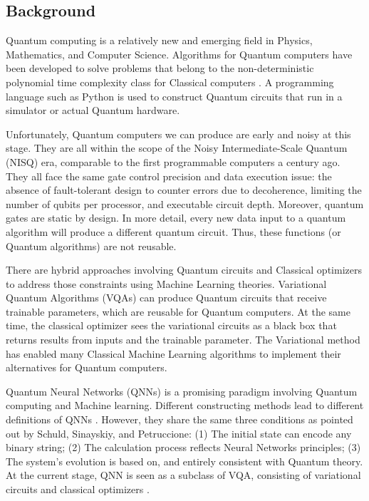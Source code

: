 \subsection{Background}\label{Background Section}
Quantum computing is a relatively new and emerging field in Physics, Mathematics, and Computer Science. 
Algorithms for Quantum computers have been developed to solve problems that belong to the non-deterministic polynomial time complexity class for Classical computers \cite{williamsSolvingNPCompleteProblems2011,jiangQuantumAnnealingPrime2018,farhiQuantumApproximateOptimization2014}. 
A programming language such as Python is used to construct Quantum circuits that run in a simulator or actual Quantum hardware. 

Unfortunately, Quantum computers we can produce are early and noisy at this stage. 
They are all within the scope of the Noisy Intermediate-Scale Quantum (NISQ) \cite{brooksQuantumSupremacyHunt2019} era, comparable to the first programmable computers a century ago. 
They all face the same gate control precision and data execution issue: the absence of fault-tolerant design to counter errors due to decoherence, limiting the number of qubits per processor, and executable circuit depth. 
Moreover, quantum gates are static by design. 
In more detail, every new data input to a quantum algorithm will produce a different quantum circuit. 
Thus, these functions (or Quantum algorithms) are not reusable.

There are hybrid approaches involving Quantum circuits and Classical optimizers to address those constraints using Machine Learning theories. 
Variational Quantum Algorithms (VQAs) \cite{cerezo2021variational} can produce Quantum circuits that receive trainable parameters, which are reusable for Quantum computers. 
At the same time, the classical optimizer sees the variational circuits as a black box that returns results from inputs and the trainable parameter. 
The Variational method has enabled many Classical Machine Learning algorithms to implement their alternatives for Quantum computers.

Quantum Neural Networks (QNNs) \cite{altaisky2001quantum} is a promising paradigm involving Quantum computing and Machine learning. 
Different constructing methods lead to different definitions of QNNs \cite{paetznick2013} \cite{zhaoBuildingQuantumNeural2019} \cite{caoQuantumNeuronElementary2017}. 
However, they share the same three conditions as pointed out by \cite{schuldQuestQuantumNeural2014} Schuld, Sinayskiy, and Petruccione: 
(1) The initial state can encode any binary string;
(2) The calculation process reflects Neural Networks principles;
(3) The system's evolution is based on, and entirely consistent with Quantum theory.
At the current stage, QNN is seen as a subclass of VQA, consisting of variational circuits and classical optimizers \cite{abbasPowerQuantumNeural2021}.

